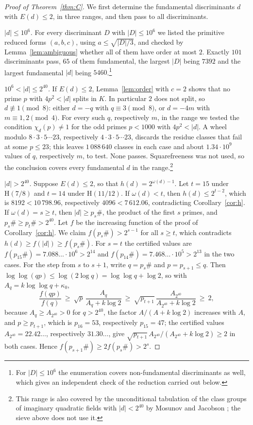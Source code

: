 \documentclass[11pt]{amsart}
\theoremstyle{definition}
\theoremstyle{remark}
\numberwithin{equation}{section}
\newcommand{\Hyp}{\mathrm{H}}
\begin{document}
\begin{proof}[Proof of Theorem~\ref{thm:C}]
We first determine the fundamental discriminants $d$ with $E(d)\le2$, in three ranges, and then pass to all discriminants.

\emph{$|d|\le10^6$.} For every discriminant $D$ with $|D|\le10^6$ we listed the primitive reduced forms $(a,b,c)$, using $a\le\sqrt{|D|/3}$, and checked by Lemma~\ref{lem:ambiguous} whether all of them have order at most $2$. Exactly $101$ discriminants pass, $65$ of them fundamental, the largest $|D|$ being $7392$ and the largest fundamental $|d|$ being $5460$.\footnote{For $|D|\le10^6$ the enumeration covers non-fundamental discriminants as well, which gives an independent check of the reduction carried out below.}

\emph{$10^6<|d|\le2^{40}$.} If $E(d)\le2$, Lemma~\ref{lem:order} with $c=2$ shows that no prime $p$ with $4p^2<|d|$ splits in $K$. In particular $2$ does not split, so $d\not\equiv1\pmod8$: either $d=-q$ with $q\equiv3\pmod 8$, or $d=-4m$ with $m\equiv1,2\pmod4$. For every such $q$, respectively $m$, in the range we tested the condition $\chi_d(p)\neq1$ for the odd primes $p<1000$ with $4p^2<|d|$. A wheel modulo $8\cdot3\cdot5\cdots23$, respectively $4\cdot3\cdot5\cdots23$, discards the residue classes that fail at some $p\le23$; this leaves $1\,088\,640$ classes in each case and about $1.34\cdot10^9$ values of $q$, respectively $m$, to test. None passes. Squarefreeness was not used, so the conclusion covers every fundamental $d$ in the range.\footnote{This range is also covered by the unconditional tabulation of the class groups of imaginary quadratic fields with $|d|<2^{40}$ by Mosunov and Jacobson \cite{MJ16}; the sieve above does not use it.}

\emph{$|d|>2^{40}$.} Suppose $E(d)\le2$, so that $h(d)=2^{\omega(d)-1}$. Let $t=15$ under $\Hyp(7/8)$ and $t=14$ under $\Hyp(11/12)$. If $\omega(d)<t$, then $h(d)\le2^{t-2}$, which is $8192<10\,798.96$, respectively $4096<7\,612.06$, contradicting Corollary~\ref{cor:h}. If $\omega(d)=s\ge t$, then $|d|\ge p_s\#$, the product of the first $s$ primes, and $p_s\#\ge p_t\#>2^{40}$. Let $f$ be the increasing function of the proof of Corollary~\ref{cor:h}. We claim $f(p_s\#)>2^{s-1}$ for all $s\ge t$, which contradicts $h(d)\ge f(|d|)\ge f(p_s\#)$. For $s=t$ the certified values are $f(p_{15}\#)=7.088\ldots\cdot10^6>2^{14}$ and $f(p_{14}\#)=7.468\ldots\cdot10^5>2^{13}$ in the two cases. For the step from $s$ to $s+1$, write $q=p_s\#$ and $p=p_{s+1}\le q$. Then $\log\log(qp)\le\log(2\log q)=\log\log q+\log2$, so with $A_q=k\log\log q+\kappa_0$,
\[
\frac{f(qp)}{f(q)}\ \ge\ \sqrt p\,\frac{A_q}{A_q+k\log2}\ \ge\ \sqrt{p_{t+1}}\,\frac{A_{2^{40}}}{A_{2^{40}}+k\log2}\ \ge\ 2,
\]
because $A_q\ge A_{2^{40}}>0$ for $q>2^{40}$, the factor $A/(A+k\log2)$ increases with $A$, and $p\ge p_{t+1}$, which is $p_{16}=53$, respectively $p_{15}=47$; the certified values $A_{2^{40}}=22.42\ldots$, respectively $31.30\ldots$, give $\sqrt{p_{t+1}}\,A_{2^{40}}/(A_{2^{40}}+k\log 2)\ge2$ in both cases. Hence $f(p_{s+1}\#)\ge2f(p_s\#)>2^s$.


\end{proof}
\end{document}
